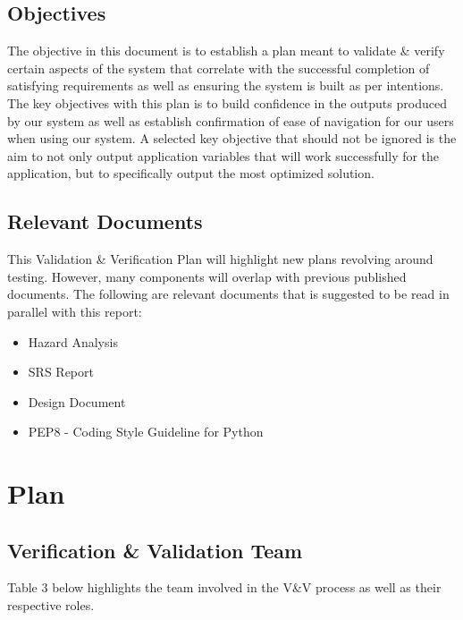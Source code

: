 \documentclass[12pt, titlepage]{article}
\begin{document}
\subsection{Objectives}
The objective in this document is to establish a plan meant to validate \& verify certain aspects of the system that correlate with the successful completion of satisfying requirements as well as ensuring the system is built as per intentions. The key objectives with this plan is to build confidence in the outputs produced by our system as well as establish confirmation of ease of navigation for our users when using our system. A selected key objective that should not be ignored is the aim to not only output application variables that will work successfully for the application, but to specifically output the most optimized solution. 

\subsection{Relevant Documents}
This Validation \& Verification Plan will highlight new plans revolving around testing. However, many components will overlap with previous published documents. The following are relevant documents that is suggested to be read in parallel with this report:
\begin{itemize}
    \item Hazard Analysis
    \item SRS Report
    \item Design Document
    \item PEP8 - Coding Style Guideline for Python
\end{itemize}


\section{Plan}

\subsection{Verification \& Validation Team}
Table 3 below highlights the team involved in the V\&V process as well as their respective roles.
\end{document}
